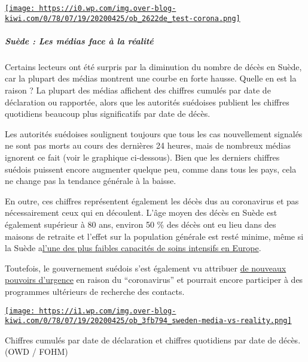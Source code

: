 \href{http://img.over-blog-kiwi.com/0/78/07/19/20200425/ob_2622de_test-corona.png\#width=680\&height=500}{\texttt{[image: https://i0.wp.com/img.over-blog-kiwi.com/0/78/07/19/20200425/ob\_2622de\_test-corona.png]}}

\hypertarget{suuxe8de--les-muxe9dias-face-uxe0-la-ruxe9alituxe9}{%
\subparagraph{\texorpdfstring{\textbf{Suède : Les médias face à la
réalité}}{Suède : Les médias face à la réalité}}\label{suuxe8de--les-muxe9dias-face-uxe0-la-ruxe9alituxe9}}

Certains lecteurs ont été surpris par la diminution du nombre de décès
en Suède, car la plupart des médias montrent une courbe en forte hausse.
Quelle en est la raison ? La plupart des médias affichent des chiffres
cumulés par date de déclaration ou rapportée, alors que les autorités
suédoises publient les chiffres quotidiens beaucoup plus significatifs
par date de décès.

Les autorités suédoises soulignent toujours que tous les cas
nouvellement signalés ne sont pas morts au cours des dernières 24
heures, mais de nombreux médias ignorent ce fait (voir le graphique
ci-dessous). Bien que les derniers chiffres suédois puissent encore
augmenter quelque peu, comme dans tous les pays, cela ne change pas la
tendance générale à la baisse.

En outre, ces chiffres représentent également les décès dus au
coronavirus et pas nécessairement ceux qui en découlent. L'âge moyen des
décès en Suède est également supérieur à 80 ans, environ 50 \% des décès
ont eu lieu dans des maisons de retraite et l'effet sur la population
générale est resté minime, même si la Suède
a\href{https://link.springer.com/article/10.1007/s00134-012-2627-8}{l'une
des plus faibles capacités de soins intensifs en Europe}.

Toutefois, le gouvernement suédois s'est également vu attribuer
\href{https://www.tagesschau.de/faktenfinder/ausland/corona-kursaenderung-schweden-103.html}{de
nouveaux pouvoirs d'urgence} en raison du ``coronavirus'' et pourrait
encore participer à des programmes ultérieurs de recherche des contacts.

\href{http://img.over-blog-kiwi.com/0/78/07/19/20200425/ob_3fb794_sweden-media-vs-reality.png\#width=736\&height=338}{\texttt{[image: https://i1.wp.com/img.over-blog-kiwi.com/0/78/07/19/20200425/ob\_3fb794\_sweden-media-vs-reality.png]}}

Chiffres cumulés par date de déclaration et chiffres quotidiens par date
de décès. (OWD / FOHM)

